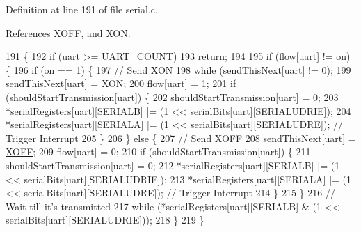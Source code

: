 Definition at line 191 of file serial.\-c.



References X\-O\-F\-F, and X\-O\-N.


\begin{DoxyCode}
191                                        \{
192     \textcolor{keywordflow}{if} (uart >= UART\_COUNT)
193         \textcolor{keywordflow}{return};
194 
195     \textcolor{keywordflow}{if} (flow[uart] != on) \{
196         \textcolor{keywordflow}{if} (on == 1) \{
197             \textcolor{comment}{// Send XON}
198             \textcolor{keywordflow}{while} (sendThisNext[uart] != 0);
199             sendThisNext[uart] = \hyperlink{group__uart_gacdf721774c51e08c6609e6fa8cf82cc9}{XON};
200             flow[uart] = 1;
201             \textcolor{keywordflow}{if} (shouldStartTransmission[uart]) \{
202                 shouldStartTransmission[uart] = 0;
203                 *serialRegisters[uart][SERIALB] |= (1 << serialBits[uart][SERIALUDRIE]);
204                 *serialRegisters[uart][SERIALA] |= (1 << serialBits[uart][SERIALUDRE]); \textcolor{comment}{// Trigger
       Interrupt}
205             \}
206         \} \textcolor{keywordflow}{else} \{
207             \textcolor{comment}{// Send XOFF}
208             sendThisNext[uart] = \hyperlink{group__uart_ga67fd78ae15d2b67c10d44d69a49ab1c5}{XOFF};
209             flow[uart] = 0;
210             \textcolor{keywordflow}{if} (shouldStartTransmission[uart]) \{
211                 shouldStartTransmission[uart] = 0;
212                 *serialRegisters[uart][SERIALB] |= (1 << serialBits[uart][SERIALUDRIE]);
213                 *serialRegisters[uart][SERIALA] |= (1 << serialBits[uart][SERIALUDRE]); \textcolor{comment}{// Trigger
       Interrupt}
214             \}
215         \}
216         \textcolor{comment}{// Wait till it's transmitted}
217         \textcolor{keywordflow}{while} (*serialRegisters[uart][SERIALB] & (1 << serialBits[uart][SERIALUDRIE]));
218     \}
219 \}
\end{DoxyCode}
